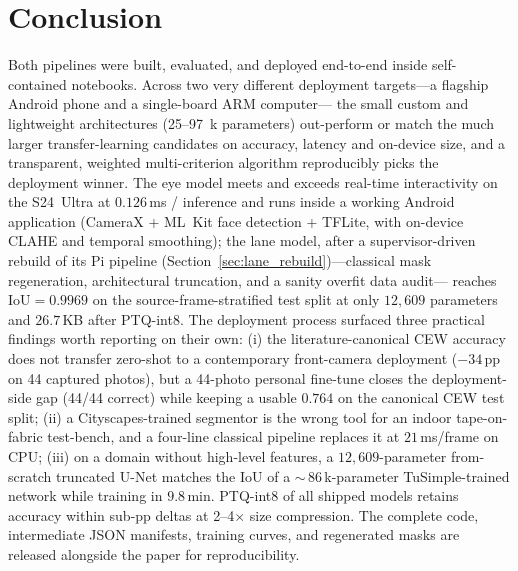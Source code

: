 \documentclass[conference]{IEEEtran}
\begin{document}
\section{Conclusion}\label{sec:conclusion}

Both pipelines were built, evaluated, and deployed end-to-end inside
self-contained notebooks. Across two very different deployment
targets---a flagship Android phone and a single-board ARM computer---
the small custom and lightweight architectures (25--97~k parameters)
out-perform or match the much larger transfer-learning candidates on
accuracy, latency and on-device size, and a transparent, weighted
multi-criterion algorithm reproducibly picks the deployment winner.
The eye model meets and exceeds real-time interactivity on the
S24~Ultra at $0.126$\,ms / inference and runs inside a
working Android application (CameraX + ML~Kit face detection +
TFLite, with on-device CLAHE and temporal smoothing); the lane
model, after a supervisor-driven rebuild of its Pi pipeline
(Section~\ref{sec:lane_rebuild})---classical mask regeneration,
architectural truncation, and a sanity overfit data audit---
reaches $\text{IoU}=0.9969$ on the source-frame-stratified test
split at only $12{,}609$ parameters and $26.7$\,KB after PTQ-int8.
The deployment process surfaced three practical findings worth
reporting on their own: (i) the literature-canonical CEW accuracy
does not transfer zero-shot to a contemporary front-camera
deployment ($-34$\,pp on 44 captured photos), but a 44-photo
personal fine-tune closes the deployment-side gap (44/44 correct)
while keeping a usable $0.764$ on the canonical CEW test split;
(ii) a Cityscapes-trained segmentor is the wrong tool for an
indoor tape-on-fabric test-bench, and a four-line classical
pipeline replaces it at $21$\,ms/frame on CPU; (iii) on a domain
without high-level features, a $12{,}609$-parameter from-scratch
truncated U-Net matches the IoU of a $\sim$\,86\,k-parameter
TuSimple-trained network while training in $9.8$\,min. PTQ-int8
of all shipped models retains accuracy within sub-pp deltas at
2--4$\times$ size compression.
The complete code, intermediate JSON manifests, training curves, and
regenerated masks are released alongside the paper for
reproducibility.
\end{document}
